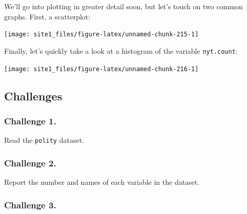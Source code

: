 \documentclass[]{book}
\newenvironment{Shaded}{\begin{snugshade}}{\end{snugshade}}
\newcommand{\KeywordTok}[1]{\textcolor[rgb]{0.13,0.29,0.53}{\textbf{#1}}}
\newcommand{\DataTypeTok}[1]{\textcolor[rgb]{0.13,0.29,0.53}{#1}}
\newcommand{\DecValTok}[1]{\textcolor[rgb]{0.00,0.00,0.81}{#1}}
\newcommand{\StringTok}[1]{\textcolor[rgb]{0.31,0.60,0.02}{#1}}
\newcommand{\OperatorTok}[1]{\textcolor[rgb]{0.81,0.36,0.00}{\textbf{#1}}}
\newcommand{\NormalTok}[1]{#1}
\begin{document}
We'll go into plotting in greater detail soon, but let's touch on two
common graphs. First, a scatterplot:

\begin{Shaded}
\end{Shaded}

\begin{center}\texttt{[image: site1\_files/figure-latex/unnamed-chunk-215-1]} \end{center}

Finally, let's quickly take a look at a histogram of the variable
\texttt{nyt.count}:

\begin{Shaded}
\end{Shaded}

\begin{center}\texttt{[image: site1\_files/figure-latex/unnamed-chunk-216-1]} \end{center}

\subsection{Challenges}\label{challenges-10}

\subsubsection*{Challenge 1.}\label{challenge-1.-5}

Read the \texttt{polity} dataset.

\subsubsection*{Challenge 2.}\label{challenge-2.-5}

Report the number and names of each variable in the dataset.

\subsubsection*{Challenge 3.}\label{challenge-3.-3}
\end{document}
